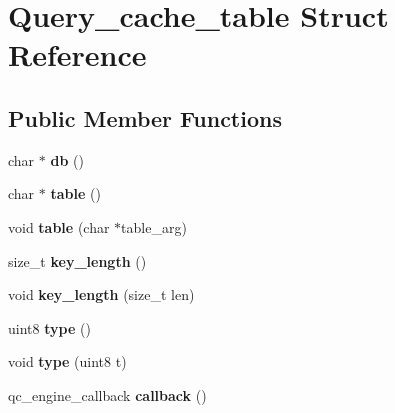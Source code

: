 \hypertarget{structQuery__cache__table}{}\section{Query\+\_\+cache\+\_\+table Struct Reference}
\label{structQuery__cache__table}
\subsection*{Public Member Functions}
\begin{DoxyCompactItemize}
\item 
\mbox{\label{structQuery__cache__table_ad46e49a934d90bccdfb51c4cfb7c25d3}} 
char $\ast$ {\bfseries db} ()
\item 
\mbox{\label{structQuery__cache__table_a49763180ad307b4339f4a8be31f776a1}} 
char $\ast$ {\bfseries table} ()
\item 
\mbox{\label{structQuery__cache__table_a3441e8ae47578c48f5526f27c35f4b52}} 
void {\bfseries table} (char $\ast$table\+\_\+arg)
\item 
\mbox{\label{structQuery__cache__table_a7aa1fdec501c357fda0cb5015abc7eea}} 
size\+\_\+t {\bfseries key\+\_\+length} ()
\item 
\mbox{\label{structQuery__cache__table_a02cabdc1474c60118b1fdaa802cc745e}} 
void {\bfseries key\+\_\+length} (size\+\_\+t len)
\item 
\mbox{\label{structQuery__cache__table_a9d1ab0b0e7f39bd879d2b5cb0294795a}} 
uint8 {\bfseries type} ()
\item 
\mbox{\label{structQuery__cache__table_aed7209435f2f239cf48c3799ca2e23d5}} 
void {\bfseries type} (uint8 t)
\item 
\mbox{\label{structQuery__cache__table_ab60dab7bd0b4bd107de42e5767797e58}} 
qc\+\_\+engine\+\_\+callback {\bfseries callback} ()
\item 
\mbox{\label{structQuery__cache__table_af08272ab33bea20a0ba1281a256d4b9b}} 

\end{DoxyCompactItemize}
